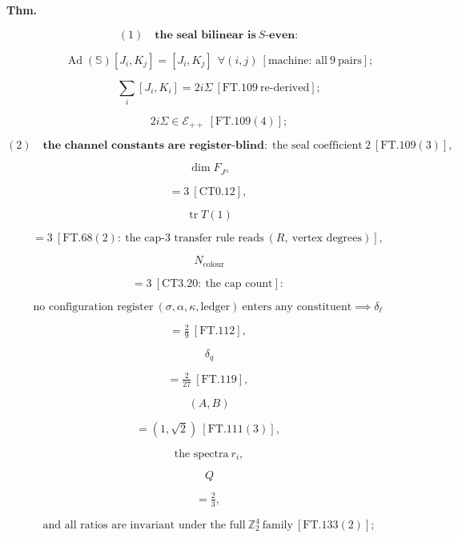 \begin{theorem}\label{tag:FT-139}
\textbf{Thm.}

\[
(1)\quad\textbf{the seal bilinear is}\ S\textbf{-even:}
\]

\[
\qquad \operatorname{Ad}(\mathbb S)[J_i,K_j]=[J_i,K_j]\ \ \forall(i,j)\ [\text{machine: all}\ 9\ \text{pairs}];
\]

\[
\qquad \sum_i[J_i,K_i]=2i\Sigma\ [\mathrm{FT.109}\ \text{re-derived}];
\]

\[
\qquad 2i\Sigma\in\mathcal E_{++}\ [\mathrm{FT.109}(4)];
\]

\[
(2)\quad\textbf{the channel constants are register-blind:}\ \ \text{the seal coefficient}\ 2\ [\mathrm{FT.109}(3)],
\]

\[
\ \dim F_{J^\pm}
\]

\[
= 3\ [\mathrm{CT0.12}],
\]

\[
\ \operatorname{tr}T(1)
\]

\[
= 3\ [\mathrm{FT.68}(2):\ \text{the cap-3 transfer rule reads}\ (R,\ \text{vertex degrees})],
\]

\[
\ N_{\text{colour}}
\]

\[
= 3\ [\mathrm{CT3.20}:\ \text{the cap count}]:
\]

\[
\text{no configuration register}\ (\sigma,\alpha,\kappa,\text{ledger})\ \text{enters any constituent}\implies\delta_\ell
\]

\[
= \tfrac29\ [\mathrm{FT.112}],
\]

\[
\ \delta_q
\]

\[
= \tfrac2{27}\ [\mathrm{FT.119}],
\]

\[
\ (A,B)
\]

\[
= (1,\sqrt2)\ [\mathrm{FT.111}(3)],
\]

\[
\ \text{the spectra}\ r_i,
\]

\[
\ Q
\]

\[
= \tfrac23,
\]

\[
\ \text{and all ratios are invariant under the full}\ \mathbb Z_2^4\ \text{family}\ [\mathrm{FT.133}(2)];
\]


\end{theorem}
